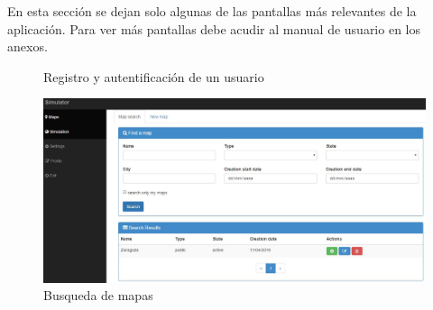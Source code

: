 En esta sección se dejan solo algunas de las pantallas más relevantes de la aplicación. Para ver más pantallas debe acudir al manual de usuario en los anexos.

\begin{figure}[H]
 \centering
 \caption{Registro y autentificación de un usuario}
 \label{f:LoginRegister}
\end{figure}

\begin{figure}[H]
\centering\includegraphics[scale=0.3]{imagenes/busqueda-de-mapas.jpg}
\caption{Busqueda de mapas}
\label{BusquedaMapas}
\end{figure}

